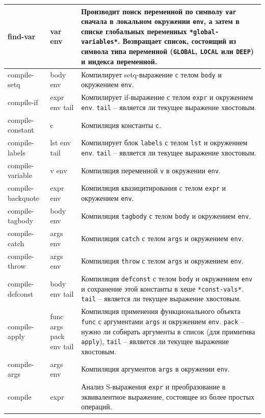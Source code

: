 \begin{xltabular}{\textwidth}{|p{2.5cm}|p{2.5cm}|X|}
	find-var & var env & Производит поиск переменной по символу \texttt{var} сначала в локальном окружении \texttt{env}, а затем в списке глобальных переменных \texttt{*global-variables*}. Возвращает список, состоящий из символа типа переменной (\texttt{GLOBAL}, \texttt{LOCAL} или \texttt{DEEP}) и индекса переменной. \\ \hline
	compile-setq & body env & Компилирует setq-выражение с телом \texttt{body} и окружением \texttt{env}. \\ \hline
	compile-if & expr env tail & Компилирует if-выражение с телом \texttt{expr} и окружением \texttt{env}. \texttt{tail} -- является ли текущее выражение хвостовым. \\ \hline
	compile-constant & c & Компиляция константы \texttt{c}. \\ \hline
	compile-labels & lst env tail & Компилирует блок \texttt{labels} с телом \texttt{lst} и окружением \texttt{env}. \texttt{tail} -- является ли текущее выражение хвостовым. \\ \hline
	compile-variable & v env & Компиляция переменной \texttt{v} в окружении \texttt{env}. \\ \hline
	compile-backquote & expr env & Компиляция квазицитирования с телом \texttt{expr} и окружением \texttt{env}. \\ \hline
	compile-tagbody & body env & Компиляция \texttt{tagbody} с телом \texttt{body} и окружением \texttt{env}. \\ \hline
	compile-catch & args env & Компиляция \texttt{catch} с телом \texttt{args} и окружением \texttt{env}. \\ \hline
	compile-throw & args env & Компиляция \texttt{throw} с телом \texttt{args} и окружением \texttt{env}. \\ \hline
	compile-defconst & body env tail & Компиляция \texttt{defconst} с телом \texttt{body} и окружением \texttt{env} и сохранение этой константы в хеше \texttt{*const-vals*}. \texttt{tail} -- является ли текущее выражение хвостовым. \\ \hline
	compile-apply & func args pack env tail & Компиляция применения функционального объекта \texttt{func} с аргументами \texttt{args} и окружением \texttt{env}. \texttt{pack} -- нужно ли собирать аргументы в список (для примитива \texttt{apply}), \texttt{tail} -- является ли текущее выражение хвостовым. \\ \hline
	compile-args & args env & Компиляция аргументов \texttt{args} в окружении \texttt{env}. \\ \hline
	compile & expr & Анализ S-выражения \texttt{expr} и преобразование в эквивалентное выражение, состоящее из более простых операций.
\end{xltabular}
\renewcommand{\arraystretch}{1.0} %


